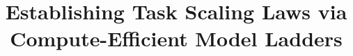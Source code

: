 \documentclass{article} %
\title{Establishing Task Scaling Laws via Compute-Efficient Model Ladders}
\author{\makecolmauthors}
\begin{document}
\ifcolmsubmission
\linenumbers
\fi

\maketitle




















\appendix

\end{document}
